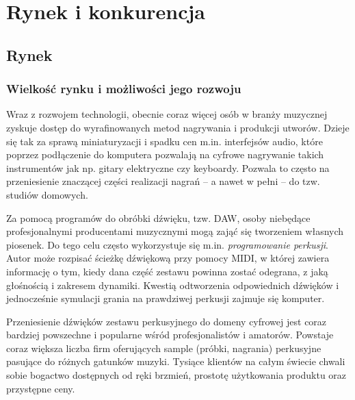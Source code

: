 \documentclass[12pt]{article}
\begin{document}
\section{Rynek i konkurencja}

\subsection{Rynek}

\subsubsection{Wielkość rynku i możliwości jego rozwoju}


Wraz z rozwojem technologii, obecnie coraz więcej osób w branży muzycznej zyskuje dostęp do wyrafinowanych metod nagrywania i produkcji utworów.
Dzieje się tak za sprawą miniaturyzacji i spadku cen m.in. interfejsów audio, które poprzez podłączenie do komputera pozwalają na cyfrowe nagrywanie takich instrumentów jak np. gitary elektryczne czy keyboardy.
Pozwala to często na przeniesienie znaczącej części realizacji nagrań -- a nawet w pełni -- do tzw. studiów domowych.

Za pomocą programów do obróbki dźwięku, tzw. DAW, osoby niebędące profesjonalnymi producentami muzycznymi mogą zająć się tworzeniem własnych piosenek.
Do tego celu często wykorzystuje się m.in. \emph{programowanie perkusji}.
Autor może rozpisać ścieżkę dźwiękową przy pomocy MIDI, w której zawiera informację o tym, kiedy dana część zestawu powinna zostać odegrana, z jaką głośnością i zakresem dynamiki.
Kwestią odtworzenia odpowiednich dźwięków i jednocześnie symulacji grania na prawdziwej perkusji zajmuje się komputer.

Przeniesienie dźwięków zestawu perkusyjnego do domeny cyfrowej jest coraz bardziej powszechne i popularne wśród profesjonalistów i amatorów.
Powstaje coraz większa liczba firm oferujących sample (próbki, nagrania) perkusyjne pasujące do różnych gatunków muzyki.
Tysiące klientów na całym świecie chwali sobie bogactwo dostępnych od ręki brzmień, prostotę użytkowania produktu oraz przystępne ceny.
\end{document}
